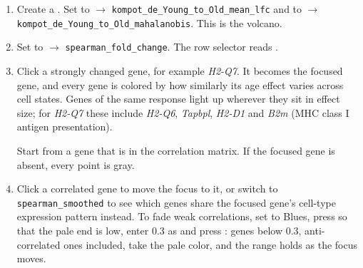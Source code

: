\begin{enumerate}[start=18]
\item Create a . Set  to  $\rightarrow$ \texttt{kompot\_de\_Young\_to\_Old\_mean\_lfc} and  to  $\rightarrow$ \texttt{kompot\_de\_Young\_to\_Old\_mahalanobis}. This is the volcano.
\troubleshoot{}

\item Set  to  $\rightarrow$ \texttt{spearman\_fold\_change}. The row selector reads .

\item Click a strongly changed gene, for example \textit{H2-Q7}. It becomes the focused gene, and every gene is colored by how similarly its age effect varies across cell states. Genes of the same response light up wherever they sit in effect size; for \textit{H2-Q7} these include \textit{H2-Q6}, \textit{Tapbpl}, \textit{H2-D1} and \textit{B2m} (MHC class I antigen presentation).

\critical{} Start from a gene that is in the correlation matrix. If the focused gene is absent, every point is gray.
\troubleshoot{}

\item Click a correlated gene to move the focus to it, or switch  to \texttt{spearman\_smoothed} to see which genes share the focused gene's cell-type expression pattern instead. To fade weak correlations, set  to Blues, press  so that the pale end is low, enter 0.3 as  and press : genes below 0.3, anti-correlated ones included, take the pale color, and the range holds as the focus moves.
\end{enumerate}
